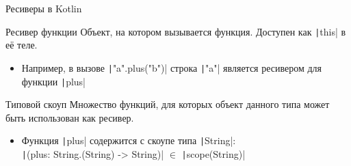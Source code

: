 \documentclass[aspectratio=169,usenames,dvipsnames]{beamer}
\begin{document}
    \begin{frame}[fragile]{Ресиверы в Kotlin}
        \begin{block}{Ресивер функции}
            Объект, на котором вызывается функция.
            Доступен как \texttt|this| в её теле.
            \begin{itemize}
                \item Например, в вызове \texttt|"a".plus("b")| строка \texttt|"a"| является ресивером для функции \texttt|plus|
            \end{itemize}
        \end{block}
        \pause
        \begin{block}{Типовой скоуп}
            Множество функций, для которых объект данного типа может быть использован как ресивер.
            \begin{itemize}
                \item Функция \texttt|plus| содержится с скоупе типа \texttt|String|: \\
                \texttt|(plus: String.(String) -> String)| $\in$ \texttt|scope(String)|
            \end{itemize}
        \end{block}
    \end{frame}
\end{document}
